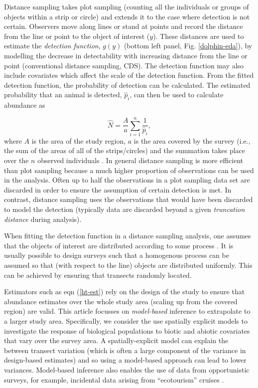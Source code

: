 \documentclass[a4paper,12pt]{article}
\begin{document}
Distance sampling takes plot sampling (counting all the individuals or groups of objects within a strip or circle) and extends it to the case where detection is not certain. Observers move along lines or stand at points and record the distance from the  line or point to the object of interest ($y$). These distances are used to estimate the \textit{detection function}, $g(y)$ (bottom left panel, Fig. \ref{dolphin-eda}), by modelling the decrease in detectability with increasing distance from the line or point (conventional distance sampling, CDS). The detection function may also include covariates \citep[multiple covariate distance sampling, MCDS;][]{Marques:2007vm} which affect the scale of the detection function. From the fitted detection function, the probability of detection can be calculated. The estimated probability that an animal is detected, $\hat{p}_i$, can then be used to calculate abundance as

\begin{equation}
\hat{N} = \frac{A}{a} \sum_{i=1}^{n} \frac{1}{\hat{p}_i},
\label{ht-est}
\end{equation}
where $A$ is the area of the study region, $a$ is the area covered by the survey (i.e., the sum of the areas of all of the strips/circles) and the summation takes place over the $n$ observed individuals \citep[Chapter 3]{Buckland:2001vm}. In general distance sampling is more efficient than plot sampling because a much higher proportion of observations can be used in the analysis. Often up to half the observations in a plot sampling data set are discarded in order to ensure the assumption of certain detection is met. In contrast, distance sampling uses the observations that would have been discarded to model the detection (typically data are discarded beyond a given \textit{truncation distance} during analysis).

When fitting the detection function in a distance sampling analysis, one assumes that the objects of interest are distributed according to some process \citep[Section 2.1]{Buckland:2001vm}. It is usually possible to design surveys such that a homogenous process can be assumed so that (with respect to the line) objects are distributed uniformly. This can be achieved by ensuring that  transects randomly located.

Estimators such as eqn (\ref{ht-est}) rely on the design of the study to ensure that abundance estimates over the whole study area (scaling up from the covered region) are valid. This article focusses on \textit{model-based} inference to extrapolate to a larger study area. Specifically, we consider the use spatially explicit models to investigate the response of biological populations to biotic and abiotic covariates that vary over the survey area. A spatially-explicit model can explain the between transect variation (which is often a large component of the variance in design-based estimates) and so using a model-based approach can lead to lower variances. Model-based inference also enables the use of data from opportunistic surveys, for example, incidental data arising from ``ecotourism'' cruises \citep{Williams:2006tz}. 
\end{document}

